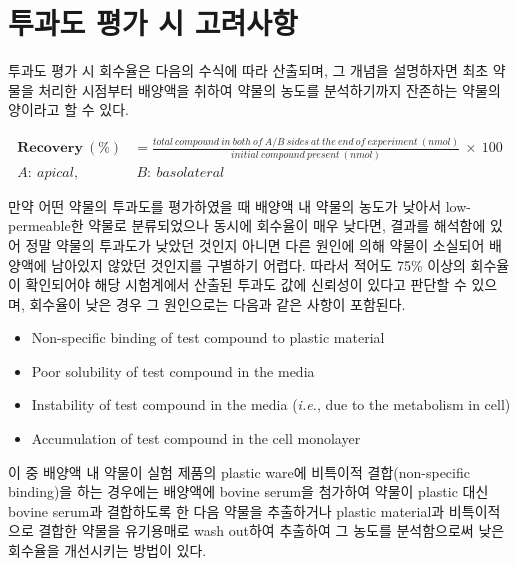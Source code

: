 \documentclass[
  11pt,
  krantz2, a4paper, twoside]{krantz}
\providecommand{\tightlist}{%
  \setlength{\itemsep}{0pt}\setlength{\parskip}{0pt}}
\begin{document}
\hypertarget{uxd22cuxacfcuxb3c4-uxd3c9uxac00-uxc2dc-uxace0uxb824uxc0acuxd56d}{%
\section{투과도 평가 시 고려사항}\label{uxd22cuxacfcuxb3c4-uxd3c9uxac00-uxc2dc-uxace0uxb824uxc0acuxd56d}}

투과도 평가 시 회수율은 다음의 수식에 따라 산출되며, 그 개념을
설명하자면 최초 약물을 처리한 시점부터 배양액을 취하여 약물의 농도를
분석하기까지 잔존하는 약물의 양이라고 할 수 있다.

\begin{equation}
\begin{split}
\mathbf{Recovery\ }\left( \mathbf{\%} \right) &= \frac{total\ compound\ in\ both\ of\ A/B\ sides\ at\ the\ end\ of\ experiment\ (nmol)}{initial\ compound\ present\ (nmol)}\  \times \ 100 \\
A:\ apical,&\ B:\ basolateral
\end{split}
\label{eq:eq02-03}
\end{equation}

만약 어떤 약물의 투과도를 평가하였을 때 배양액 내 약물의 농도가 낮아서
low-permeable한 약물로 분류되었으나 동시에 회수율이 매우 낮다면, 결과를
해석함에 있어 정말 약물의 투과도가 낮았던 것인지 아니면 다른 원인에 의해
약물이 소실되어 배양액에 남아있지 않았던 것인지를 구별하기 어렵다.
따라서 적어도 75\% 이상의 회수율이 확인되어야 해당 시험계에서 산출된
투과도 값에 신뢰성이 있다고 판단할 수 있으며, 회수율이 낮은 경우 그
원인으로는 다음과 같은 사항이 포함된다.

\begin{itemize}
\tightlist
\item
  Non-specific binding of test compound to plastic material
\item
  Poor solubility of test compound in the media
\item
  Instability of test compound in the media (\emph{i.e.}, due to the
  metabolism in cell)
\item
  Accumulation of test compound in the cell monolayer
\end{itemize}

이 중 배양액 내 약물이 실험 제품의 plastic ware에 비특이적
결합(non-specific binding)을 하는 경우에는 배양액에 bovine serum을
첨가하여 약물이 plastic 대신 bovine serum과 결합하도록 한 다음 약물을
추출하거나 plastic material과 비특이적으로 결합한 약물을 유기용매로 wash
out하여 추출하여 그 농도를 분석함으로써 낮은 회수율을 개선시키는 방법이
있다.
\end{document}
